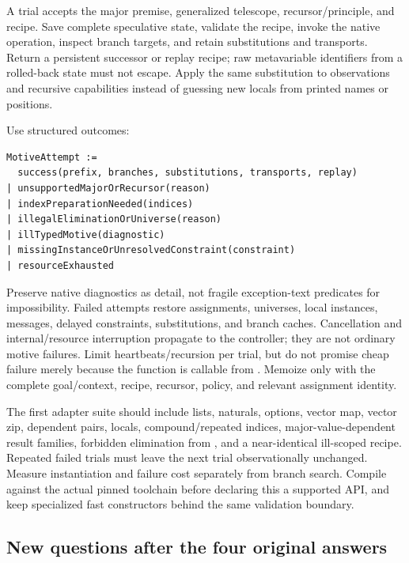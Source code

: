 A trial accepts the major premise, generalized telescope, recursor/principle,
and recipe. Save complete speculative state, validate the recipe, invoke the
native operation, inspect branch targets, and retain substitutions and
transports. Return a persistent successor or replay recipe; raw metavariable
identifiers from a rolled-back state must not escape. Apply the same
substitution to observations and recursive capabilities instead of guessing
new locals from printed names or positions.

Use structured outcomes:
\begin{lstlisting}[caption={Proposed adapter results; pseudocode.}]
MotiveAttempt :=
  success(prefix, branches, substitutions, transports, replay)
| unsupportedMajorOrRecursor(reason)
| indexPreparationNeeded(indices)
| illegalEliminationOrUniverse(reason)
| illTypedMotive(diagnostic)
| missingInstanceOrUnresolvedConstraint(constraint)
| resourceExhausted
\end{lstlisting}
Preserve native diagnostics as detail, not fragile exception-text predicates
for impossibility. Failed attempts restore assignments, universes, local
instances, messages, delayed constraints, substitutions, and branch caches.
Cancellation and internal/resource interruption propagate to the controller;
they are not ordinary motive failures. Limit heartbeats/recursion per trial,
but do not promise cheap failure merely because the function is callable from
. Memoize only with the complete goal/context, recipe, recursor,
policy, and relevant assignment identity.

The first adapter suite should include lists, naturals, options, vector map,
vector zip, dependent pairs,  locals, compound/repeated indices,
major-value-dependent result families, forbidden elimination from ,
and a near-identical ill-scoped recipe. Repeated failed trials must leave the
next trial observationally unchanged. Measure instantiation and failure cost
separately from branch search. Compile against the actual pinned toolchain
before declaring this a supported API, and keep specialized fast constructors
behind the same validation boundary.

\subsection{New questions after the four original answers}\label{sec:dependent-open}

